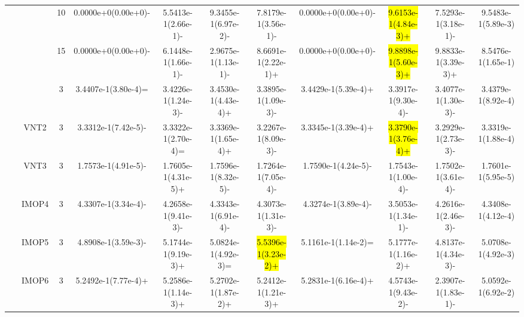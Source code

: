 \documentclass[a4paper,fleqn]{cas-dc}
\newcommand{\highlight}[1]{
	\begingroup
	\sethlcolor{Seashell}%
	\hl{#1}%
	\endgroup
}
\begin{document}
\begin{sloppypar}
\begin{table}[ht]
{\begin{tabular}{ccccccccccc}
					\multirow{9}{*}{~}&\multirow{3}{*}{~} &10 	&0.0000e+0(0.00e+0)-	&5.5413e-1(2.66e-1)-	&9.3455e-1(6.97e-2)-	&7.8179e-1(3.56e-1)-	&0.0000e+0(0.00e+0)-	&\highlight{9.6153e-1(4.84e-3)+}	&7.5293e-1(3.18e-1)-	&9.5483e-1(5.89e-3)\\
					
					\multirow{9}{*}{~}&\multirow{3}{*}{~} &15 &0.0000e+0(0.00e+0)-	&6.1448e-1(1.66e-1)-	&2.9675e-1(1.13e-1)-	&8.6691e-1(2.22e-1)+	&0.0000e+0(0.00e+0)-	&\highlight{9.8898e-1(5.60e-3)+}	&9.8833e-1(3.39e-3)+	&8.5476e-1(1.65e-1)\\
					
					
					
					
					
					\midrule[0.35pt]
					\multirow{8}{*}{Other}&{VNT1} &3  &3.4407e-1(3.80e-4)=		&3.4226e-1(1.24e-3)-	&3.4530e-1(4.43e-4)+	&3.3895e-1(1.09e-3)-	&3.4429e-1(5.39e-4)+	&3.3917e-1(9.30e-4)-	&3.4077e-1(1.30e-3)-	&3.4379e-1(8.92e-4)\\ 
					
					\multirow{8}{*}{~}&{VNT2} &3  	&3.3312e-1(7.42e-5)-		&3.3322e-1(2.70e-4)=	&3.3369e-1(1.65e-4)+	&3.2267e-1(8.09e-3)-	&3.3345e-1(3.39e-4)+	&\highlight{3.3790e-1(3.76e-4)+}	&3.2929e-1(2.73e-3)-	&3.3319e-1(1.88e-4)\\
					
					\multirow{8}{*}{~}&{VNT3} &3 &1.7573e-1(4.91e-5)-		&1.7605e-1(4.31e-5)+	&1.7596e-1(8.32e-5)-	&1.7264e-1(7.05e-4)-	&1.7590e-1(4.24e-5)-	&1.7543e-1(1.00e-4)-	&1.7502e-1(3.61e-4)-	&1.7601e-1(5.95e-5)\\
					
					
					
					
					
					
					\multirow{8}{*}{~}&{IMOP4} &3  &4.3307e-1(3.34e-4)-		&4.2658e-1(9.41e-3)-	&4.3343e-1(6.91e-4)-	&4.3073e-1(1.31e-3)-	&4.3274e-1(3.89e-4)-	&3.5053e-1(1.34e-1)-	&4.2616e-1(2.46e-3)-	&4.3408e-1(4.12e-4)\\ 
					
					\multirow{8}{*}{~}&{IMOP5} &3 &4.8908e-1(3.59e-3)-		&5.1744e-1(9.19e-3)+	&5.0824e-1(4.92e-3)=	&\highlight{5.5396e-1(3.23e-2)+}	&5.1161e-1(1.14e-2)=	&5.1777e-1(1.16e-2)+	&4.8137e-1(4.34e-3)-	&5.0708e-1(4.92e-3)\\
					
					\multirow{8}{*}{~}&{IMOP6} &3  &5.2492e-1(7.77e-4)+		&5.2586e-1(1.14e-3)+	&5.2702e-1(1.87e-2)+	&5.2412e-1(1.21e-3)+	&5.2831e-1(6.16e-4)+	&4.5743e-1(9.43e-2)-	&2.3907e-1(1.83e-1)-	&5.0592e-1(6.92e-2)\\
					

\end{tabular}}
\end{table}
\end{sloppypar}
\end{document}
